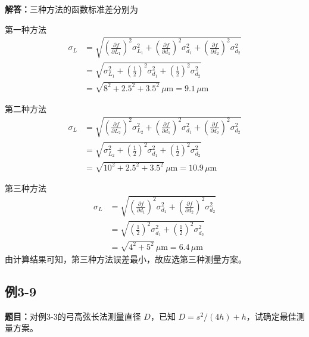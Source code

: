 \documentclass[UTF8,zihao=-4]{ctexart}
\newcommand{\problem}[1]{\subsection*{#1}}
\newcommand{\timu}{\noindent\textbf{题目：}}
\newcommand{\jieda}{\noindent\textbf{解答：}}
\begin{document}
\jieda 三种方法的函数标准差分别为

第一种方法
\begin{equation*}
\begin{aligned}
    \sigma_L
    &=
    \sqrt{
    \left(\frac{\partial f}{\partial L_1}\right)^2\sigma_{L_1}^2
    +
    \left(\frac{\partial f}{\partial d_1}\right)^2\sigma_{d_1}^2
    +
    \left(\frac{\partial f}{\partial d_2}\right)^2\sigma_{d_2}^2
    }\\
    &=
    \sqrt{
    \sigma_{L_1}^2
    +
    \left(\frac{1}{2}\right)^2\sigma_{d_1}^2
    +
    \left(\frac{1}{2}\right)^2\sigma_{d_2}^2
    }\\
    &=
    \sqrt{8^2+2.5^2+3.5^2}\,\mu\mathrm{m}
    =
    9.1\,\mu\mathrm{m}
\end{aligned}
\end{equation*}

第二种方法
\begin{equation*}
\begin{aligned}
    \sigma_L
    &=
    \sqrt{
    \left(\frac{\partial f}{\partial L_2}\right)^2\sigma_{L_2}^2
    +
    \left(\frac{\partial f}{\partial d_1}\right)^2\sigma_{d_1}^2
    +
    \left(\frac{\partial f}{\partial d_2}\right)^2\sigma_{d_2}^2
    }\\
    &=
    \sqrt{
    \sigma_{L_2}^2
    +
    \left(\frac{1}{2}\right)^2\sigma_{d_1}^2
    +
    \left(\frac{1}{2}\right)^2\sigma_{d_2}^2
    }\\
    &=
    \sqrt{10^2+2.5^2+3.5^2}\,\mu\mathrm{m}
    =
    10.9\,\mu\mathrm{m}
\end{aligned}
\end{equation*}

第三种方法
\begin{equation*}
\begin{aligned}
    \sigma_L
    &=
    \sqrt{
    \left(\frac{\partial f}{\partial d_1}\right)^2\sigma_{d_1}^2
    +
    \left(\frac{\partial f}{\partial d_2}\right)^2\sigma_{d_2}^2
    }\\
    &=
    \sqrt{
    \left(\frac{1}{2}\right)^2\sigma_{d_1}^2
    +
    \left(\frac{1}{2}\right)^2\sigma_{d_2}^2
    }\\
    &=
    \sqrt{4^2+5^2}\,\mu\mathrm{m}
    =
    6.4\,\mu\mathrm{m}
\end{aligned}
\end{equation*}
由计算结果可知，第三种方法误差最小，故应选第三种测量方案。

\problem{例3-9}
\timu 对例3-3的弓高弦长法测量直径 $D$，已知 $D=s^2/(4h)+h$，试确定最佳测量方案。
\end{document}
